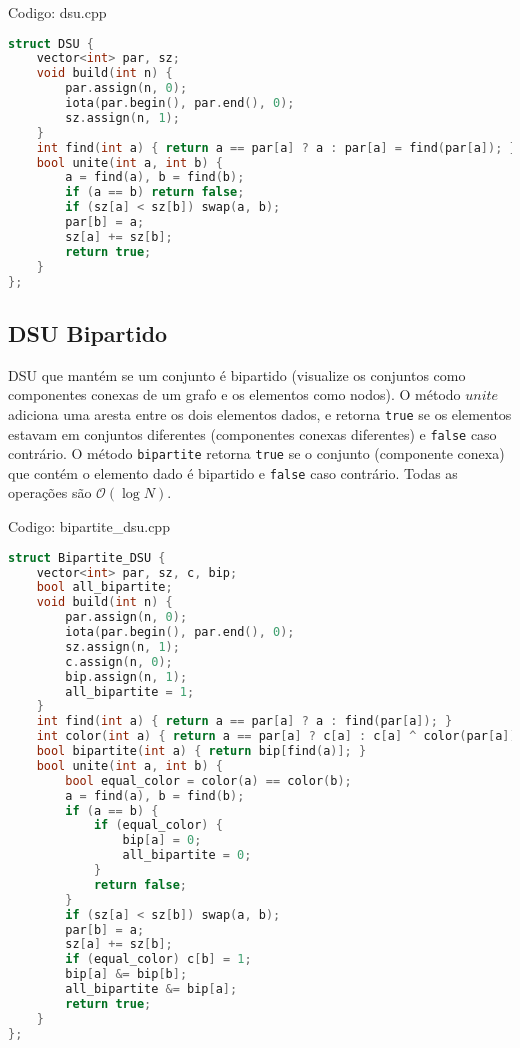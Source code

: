 \documentclass[10pt, a4paper, oneside]{book}
\begin{document}
\hfill

Codigo: dsu.cpp

\begin{lstlisting}[language=C++]
struct DSU {
    vector<int> par, sz;
    void build(int n) {
        par.assign(n, 0);
        iota(par.begin(), par.end(), 0);
        sz.assign(n, 1);
    }
    int find(int a) { return a == par[a] ? a : par[a] = find(par[a]); }
    bool unite(int a, int b) {
        a = find(a), b = find(b);
        if (a == b) return false;
        if (sz[a] < sz[b]) swap(a, b);
        par[b] = a;
        sz[a] += sz[b];
        return true;
    }
};
\end{lstlisting}
\hfill

\subsection{DSU Bipartido}


DSU que mantém se um conjunto é bipartido (visualize os conjuntos como componentes conexas de um grafo e os elementos como nodos). O método $unite$ adiciona uma aresta entre os dois elementos dados, e retorna \texttt{true} se os elementos estavam em conjuntos diferentes (componentes conexas diferentes) e \texttt{false} caso contrário. O método \texttt{bipartite} retorna \texttt{true} se o conjunto (componente conexa) que contém o elemento dado é bipartido e \texttt{false} caso contrário. Todas as operações são $\mathcal{O}(\log N)$.

\hfill

Codigo: bipartite\_dsu.cpp

\begin{lstlisting}[language=C++]
struct Bipartite_DSU {
    vector<int> par, sz, c, bip;
    bool all_bipartite;
    void build(int n) {
        par.assign(n, 0);
        iota(par.begin(), par.end(), 0);
        sz.assign(n, 1);
        c.assign(n, 0);
        bip.assign(n, 1);
        all_bipartite = 1;
    }
    int find(int a) { return a == par[a] ? a : find(par[a]); }
    int color(int a) { return a == par[a] ? c[a] : c[a] ^ color(par[a]); }
    bool bipartite(int a) { return bip[find(a)]; }
    bool unite(int a, int b) {
        bool equal_color = color(a) == color(b);
        a = find(a), b = find(b);
        if (a == b) {
            if (equal_color) {
                bip[a] = 0;
                all_bipartite = 0;
            }
            return false;
        }
        if (sz[a] < sz[b]) swap(a, b);
        par[b] = a;
        sz[a] += sz[b];
        if (equal_color) c[b] = 1;
        bip[a] &= bip[b];
        all_bipartite &= bip[a];
        return true;
    }
};
\end{lstlisting}
\hfill
\end{document}
